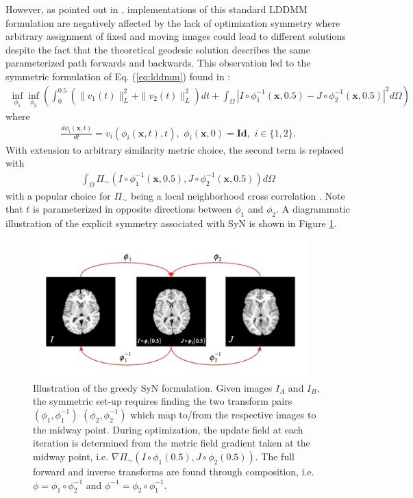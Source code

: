 \documentclass{frontiersSCNS}
\begin{document}
However,
as pointed out in \cite{avants2008}, implementations of this standard
LDDMM formulation are negatively affected by the lack of optimization
symmetry where arbitrary assignment of fixed and moving images could
lead to different solutions despite the fact that the theoretical
geodesic solution describes the same parameterized path forwards and backwards.
This observation led to the symmetric
formulation of Eq. (\ref{eq:lddmm}) found in \cite{avants2008}:
\begin{align}
  \inf_{\phi_1} \inf_{\phi_2} \left(
                     \int_0^{0.5} \left( \|v_1(t)\|_L^2 + \|v_2(t)\|_L^2 \right) dt +
                     \int_{\Omega} | I \circ \phi_1^{-1}(\mathbf{x},0.5)
                           - J \circ \phi_2^{-1}(\mathbf{x},0.5) |^2 d\Omega
              \right)
\end{align}
where
\begin{align}
  \frac{d \phi_i(\mathbf{x},t)}{dt} = v_i( \phi_i(\mathbf{x},t), t ),\,\, \phi_i(\mathbf{x},0) = \mathbf{Id}, \,\, i \in \{1,2\}.
\end{align}
With extension to arbitrary similarity metric choice, the second
term is replaced with
\begin{align}
\int_{\Omega} \Pi_{\sim}
                          \left( I \circ \phi_1^{-1}(\mathbf{x},0.5),
                           J \circ \phi_2^{-1}(\mathbf{x},0.5) \right) d\Omega
\end{align}
with a popular choice for $\Pi_{\sim}$ being a local neighborhood cross
correlation \citep{avants2008,avants2011}.
Note that
$t$ is parameterized in opposite directions between $\phi_1$ and $\phi_2$.
A diagrammatic
illustration of the explicit symmetry associated with SyN is shown in
Figure \ref{fig:syn}.

\begin{figure}[htb]
  \centering
  \includegraphics[width=0.95\textwidth]{SyN.jpg}
  \caption{Illustration of the greedy SyN formulation.  Given images
  $I_A$ and $I_B$, the symmetric set-up requires finding the two
  transform pairs $\left(\phi_1,\phi_1^{-1}\right)$
  $\left(\phi_2,\phi_2^{-1}\right)$ which map to/from
  the respective images to the midway point. During
  optimization, the update field at each iteration is
  determined from the metric field gradient taken at
  the midway point, i.e.
  $\nabla \Pi_{\sim} \left(I\circ\phi_1(0.5),J\circ\phi_2(0.5)\right)$.
  The full
  forward and inverse transforms are found through
  composition, i.e. $\phi=\phi_1 \circ \phi_2^{-1}$ and
  $\phi^{-1}=\phi_2 \circ \phi_1^{-1}$.
  }
  \label{fig:syn}
\end{figure}
\end{document}
